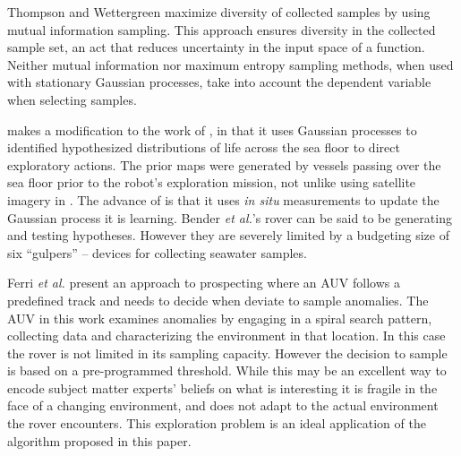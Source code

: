 
Thompson and Wettergreen \cite{thompson2008intelligent} maximize diversity of
collected samples by using mutual information sampling.  This approach ensures
diversity in the collected sample set, an act that reduces uncertainty in the
input space of a function.  Neither mutual information nor maximum entropy
sampling methods, when used with stationary Gaussian processes, take into
account the dependent variable when selecting samples.  


\cite{bender2013autonomous} makes a modification to the work of
\cite{thompson2008intelligent}, in that it uses Gaussian processes to
identified hypothesized distributions of life across the sea floor to direct
exploratory actions.  The prior maps were generated by vessels passing over the
sea floor prior to the robot's exploration mission, not unlike using satellite
imagery in \cite{thompson2008intelligent}.  The advance of
\cite{bender2013autonomous} is that it uses \emph{in situ} measurements to
update the Gaussian process it is learning.  Bender \emph{et al.}'s rover can
be said to be generating and testing hypotheses.  However they are severely
limited by a budgeting size of six ``gulpers'' -- devices for collecting
seawater samples.


Ferri \emph{et al.} \cite{ferri2010novel} present an approach to prospecting where an AUV follows a predefined track and needs to decide when deviate to sample anomalies.  The AUV in this work examines anomalies by engaging in a spiral search pattern, collecting data and characterizing the environment in that location.  In this case the rover is not limited in its sampling capacity.  However the decision to sample is based on a pre-programmed threshold.  While this may be an excellent way to encode subject matter experts' beliefs on what is interesting it is fragile in the face of a changing environment, and does not adapt to the actual environment the rover encounters.  This exploration problem is an ideal application of the algorithm proposed in this paper.
 
% 
% 

